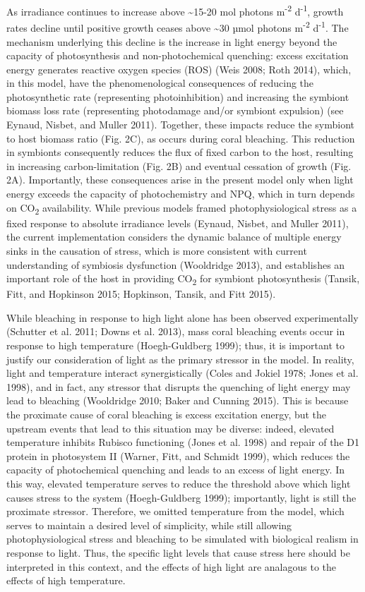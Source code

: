 \documentclass[]{elsarticle} %
\begin{document}
As irradiance continues to increase above \textasciitilde{}15-20 mol
photons m\textsuperscript{-2} d\textsuperscript{-1}, growth rates
decline until positive growth ceases above \textasciitilde{}30 µmol
photons m\textsuperscript{-2} d\textsuperscript{-1}. The mechanism
underlying this decline is the increase in light energy beyond the
capacity of photosynthesis and non-photochemical quenching: excess
excitation energy generates reactive oxygen species (ROS) (Weis 2008;
Roth 2014), which, in this model, have the phenomenological consequences
of reducing the photosynthetic rate (representing photoinhibition) and
increasing the symbiont biomass loss rate (representing photodamage
and/or symbiont expulsion) (see Eynaud, Nisbet, and Muller 2011).
Together, these impacts reduce the symbiont to host biomass ratio (Fig.
2C), as occurs during coral bleaching. This reduction in symbionts
consequently reduces the flux of fixed carbon to the host, resulting in
increasing carbon-limitation (Fig. 2B) and eventual cessation of growth
(Fig. 2A). Importantly, these consequences arise in the present model
only when light energy exceeds the capacity of photochemistry and NPQ,
which in turn depends on CO\textsubscript{2} availability. While
previous models framed photophysiological stress as a fixed response to
absolute irradiance levels (Eynaud, Nisbet, and Muller 2011), the
current implementation considers the dynamic balance of multiple energy
sinks in the causation of stress, which is more consistent with current
understanding of symbiosis dysfunction (Wooldridge 2013), and
establishes an important role of the host in providing
CO\textsubscript{2} for symbiont photosynthesis (Tansik, Fitt, and
Hopkinson 2015; Hopkinson, Tansik, and Fitt 2015).

While bleaching in response to high light alone has been observed
experimentally (Schutter et al. 2011; Downs et al. 2013), mass coral
bleaching events occur in response to high temperature (Hoegh-Guldberg
1999); thus, it is important to justify our consideration of light as
the primary stressor in the model. In reality, light and temperature
interact synergistically (Coles and Jokiel 1978; Jones et al. 1998), and
in fact, any stressor that disrupts the quenching of light energy may
lead to bleaching (Wooldridge 2010; Baker and Cunning 2015). This is
because the proximate cause of coral bleaching is excess excitation
energy, but the upstream events that lead to this situation may be
diverse: indeed, elevated temperature inhibits Rubisco functioning
(Jones et al. 1998) and repair of the D1 protein in photosystem II
(Warner, Fitt, and Schmidt 1999), which reduces the capacity of
photochemical quenching and leads to an excess of light energy. In this
way, elevated temperature serves to reduce the threshold above which
light causes stress to the system (Hoegh-Guldberg 1999); importantly,
light is still the proximate stressor. Therefore, we omitted temperature
from the model, which serves to maintain a desired level of simplicity,
while still allowing photophysiological stress and bleaching to be
simulated with biological realism in response to light. Thus, the
specific light levels that cause stress here should be interpreted in
this context, and the effects of high light are analagous to the effects
of high temperature.
\end{document}
